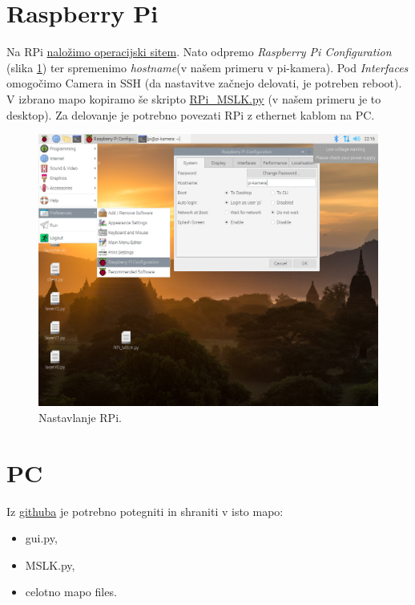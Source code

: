 \section{Raspberry Pi}
Na RPi \href{https://www.raspberrypi.org/documentation/computers/getting-started.html}{naložimo operacijski sitem}. Nato odpremo \textit{Raspberry Pi Configuration} (slika \ref{fig:pi_nast}) ter spremenimo \textit{hostname}(v našem primeru v pi-kamera). Pod \textit{Interfaces} omogočimo Camera in SSH (da nastavitve začnejo delovati, je potreben reboot). V izbrano mapo kopiramo še skripto \href{https://github.com/nekajcasa/MSLK}{RPi\_MSLK.py} (v našem primeru je to desktop). Za delovanje je potrebno povezati RPi z ethernet kablom na PC.
\begin{figure}[H]
    \centering
    \includegraphics[width=\linewidth]{slike/pi1.png}
    \caption{Nastavlanje RPi.}
    \label{fig:pi_nast}
\end{figure}

\section{PC}
Iz \href{https://github.com/nekajcasa/MSLK}{githuba} je potrebno potegniti in shraniti v isto mapo:
\begin{itemize}
    \item gui.py,
    \item MSLK.py,
    \item celotno mapo files.
\end{itemize}


